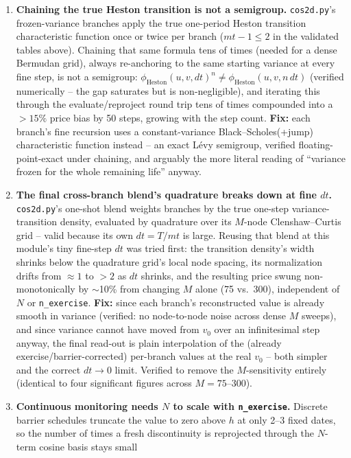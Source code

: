 \documentclass[11pt]{article}
\begin{document}
\begin{enumerate}
\item \textbf{Chaining the true Heston transition is not a semigroup.}
\texttt{cos2d.py}'s frozen-variance branches apply the true one-period
Heston transition characteristic function once or twice per branch
($mt{-}1 \le 2$ in the validated tables above). Chaining that same formula
tens of times (needed for a dense Bermudan grid), always re-anchoring to the
same starting variance at every fine step, is not a semigroup:
$\phi_{\text{Heston}}(u,v,dt)^n \ne \phi_{\text{Heston}}(u,v,n\,dt)$ (verified
numerically -- the gap saturates but is non-negligible), and iterating this
through the evaluate/reproject round trip tens of times compounded into a
$>15\%$ price bias by 50 steps, growing with the step count. \textbf{Fix:}
each branch's fine recursion uses a constant-variance Black--Scholes(+jump)
characteristic function instead -- an exact L\'evy semigroup, verified
floating-point-exact under chaining, and arguably the more literal reading
of ``variance frozen for the whole remaining life'' anyway.
\item \textbf{The final cross-branch blend's quadrature breaks down at fine
$dt$.} \texttt{cos2d.py}'s one-shot blend weights branches by the true
one-step variance-transition density, evaluated by quadrature over its
$M$-node Clenshaw--Curtis grid -- valid because its own $dt{=}T/mt$ is large.
Reusing that blend at this module's tiny fine-step $dt$ was tried first: the
transition density's width shrinks below the quadrature grid's local node
spacing, its normalization drifts from $\approx 1$ to $>2$ as $dt$ shrinks,
and the resulting price swung non-monotonically by $\sim$10\% from changing
$M$ alone (75 vs.\ 300), independent of $N$ or \texttt{n\_exercise}.
\textbf{Fix:} since each branch's reconstructed value is already smooth in
variance (verified: no node-to-node noise across dense $M$ sweeps), and since
variance cannot have moved from $v_0$ over an infinitesimal step anyway, the
final read-out is plain interpolation of the (already exercise/barrier-corrected)
per-branch values at the real $v_0$ -- both simpler and the correct $dt\to0$
limit. Verified to remove the $M$-sensitivity entirely (identical to four
significant figures across $M{=}75$--$300$).
\item \textbf{Continuous monitoring needs $N$ to scale with
\texttt{n\_exercise}.} Discrete barrier schedules truncate the value to zero
above $h$ at only 2--3 fixed dates, so the number of times a fresh
discontinuity is reprojected through the $N$-term cosine basis stays small

\end{enumerate}
\end{document}
